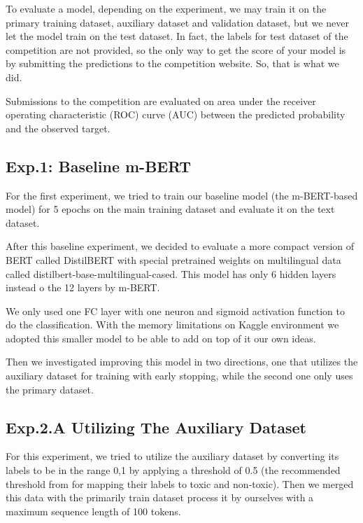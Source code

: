 \documentclass[10pt,twocolumn,letterpaper]{article}
\begin{document}
To evaluate a model, depending on the experiment, we may train it on the primary training dataset, auxiliary dataset and validation dataset, but we never let the model train on the test dataset. In fact, the labels for test dataset of the competition are not provided, so the only way to get the score of your model is by submitting the predictions to the competition website. So, that is what we did.

Submissions to the competition are evaluated on area under the receiver operating characteristic (ROC) curve (AUC) between the predicted probability and the observed target. 


  
\subsection{Exp.1: Baseline m-BERT}

For the first experiment, we tried to train our baseline model (the m-BERT-based model) for 5 epochs on the main training dataset and evaluate it on the text dataset. 

After this baseline experiment, we decided to evaluate a more compact version of BERT called DistilBERT with special pretrained weights on multilingual data called distilbert-base-multilingual-cased. This model has only 6 hidden layers instead o the 12 layers by m-BERT. 

We only used one FC layer with one neuron and sigmoid activation function to do the classification. With the memory  limitations on Kaggle environment we adopted this smaller model to be able to add on top of it our own ideas.

Then we investigated improving this model in two directions, one that utilizes the auxiliary dataset for training with early stopping, while the second one only uses the primary dataset.


\subsection{Exp.2.A Utilizing The Auxiliary Dataset}

For this experiment, we tried to utilize the auxiliary dataset by converting its labels to be in the range {0,1} by applying a threshold of 0.5 (the recommended threshold from \cite{Jigsaw2} for mapping their labels to toxic and non-toxic). Then we merged this data with the primarily train dataset process it by ourselves with a maximum sequence length of 100 tokens. 
\end{document}

